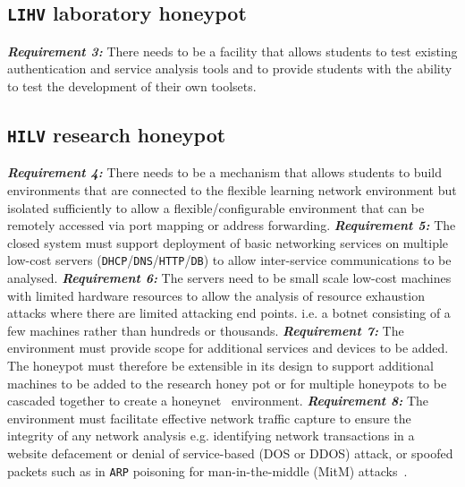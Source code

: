 \subsection{\texttt{LIHV} laboratory honeypot}\label{subsec:LabHoneypot}
\noindent \emph{\textbf{Requirement 3:}} There needs to be a facility that allows students to test existing authentication and service analysis tools and to provide students with the ability to test the development of their own toolsets. 

\subsection{\texttt{HILV} research honeypot}\label{subsec:ResearchHoneypot}
\noindent \emph{\textbf{Requirement 4:}} There needs to be a mechanism that allows students to build environments that are connected to the flexible learning network environment but isolated sufficiently to allow a flexible/configurable environment that can be remotely accessed via port mapping or address forwarding. 
\newline\newline
\noindent \emph{\textbf{Requirement 5:}} The closed system must support deployment of basic networking services on multiple low-cost servers (\texttt{DHCP}/\texttt{DNS}/\texttt{HTTP}/\texttt{DB}) to allow inter-service communications to be analysed. 
\newline\newline
\noindent \emph{\textbf{Requirement 6:}} The servers need to be small scale low-cost machines with limited hardware resources to allow the analysis of resource exhaustion attacks where there are limited attacking end points. i.e. a botnet consisting of a few machines rather than hundreds or thousands. 
\newline\newline
\noindent \emph{\textbf{Requirement 7:}} The environment must provide scope for additional services and devices to be added. The honeypot must therefore be extensible in its design to support additional machines to be added to the research honey pot or for multiple honeypots to be cascaded together to create a honeynet~\cite{AA:15,FDF:15,KNC:15} environment.
\newline\newline
\noindent \emph{\textbf{Requirement 8:}} The environment must facilitate effective network traffic capture to ensure the integrity of any network analysis e.g. identifying network transactions in a website defacement or denial of service-based (DOS or DDOS) attack, or spoofed packets such as in \texttt{ARP} poisoning for man-in-the-middle (MitM) attacks~\cite{PS:16,RSKA:16}.  

